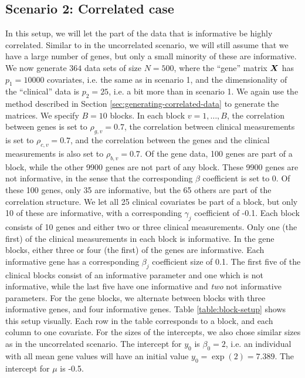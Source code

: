 \subsection{Scenario 2: Correlated case}
In this setup, we will let the part of the data that is informative be highly correlated.
Similar to in the uncorrelated scenario, we will still assume that we have a large number of genes, but only a small minority of these are informative.
We now generate $364$ data sets of size $N=500$, where the ``gene'' matrix $\bm{X}$ has $p_1=10000$ covariates, i.e. the same as in scenario 1, and the dimensionality of the ``clinical'' data is $p_2=25$, i.e. a bit more than in scenario 1.
We again use the method described in Section \ref{sec:generating-correlated-data} to generate the matrices.
We specify $B=10$ blocks.
In each block $v=1,\ldots,B$, the correlation between genes is set to $\rho_{g,v}=0.7$, the correlation between clinical measurements is set to $\rho_{c,v}=0.7$, and the correlation between the genes and the clinical measurements is also set to $\rho_{b,v}=0.7$.
Of the gene data, 100 genes are part of a block, while the other 9900 genes are not part of any block.
These 9900 genes are not informative, in the sense that the corresponding $\beta$ coefficient is set to 0.
Of these 100 genes, only 35 are informative, but the 65 others are part of the correlation structure.
We let all 25 clinical covariates be part of a block, but only 10 of these are informative, with a corresponding $\gamma_j$ coefficient of -0.1.
Each block consists of 10 genes and either two or three clinical measurements.
Only one (the first) of the clinical measurements in each block is informative.
In the gene blocks, either three or four (the first) of the genes are informative.
Each informative gene has a corresponding $\beta_j$ coefficient size of 0.1.
The first five of the clinical blocks consist of an informative parameter and one which is not informative, while the last five have one informative and \textit{two} not informative parameters.
For the gene blocks, we alternate between blocks with three informative genes, and four informative genes.
Table \ref{table:block-setup} shows this setup visually.
Each row in the table corresponds to a block, and each column to one covariate.
For the sizes of the intercepts, we also chose similar sizes as in the uncorrelated scenario.
The intercept for $y_0$ is $\beta_0=2$, i.e. an individual with all mean gene values will have an initial value $y_0=\exp(2)=7.389$.
The intercept for $\mu$ is -0.5.
